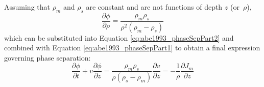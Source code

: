 Assuming that $\rho_m$ and $\rho_s$ are constant and are not functions of depth $z$ (or~$\rho$),
\begin{equation}
\frac{\partial \phi}{\partial \rho} = \frac{\rho_m \rho_s}{\rho^2 (\rho_m-\rho_s)}
\label{eq:abe1993_dphidrho}
\end{equation}
which can be substituted into Equation \ref{eq:abe1993_phaseSepPart2} and combined with Equation \ref{eq:abe1993_phaseSepPart1} to obtain a final expression governing phase separation:
\begin{equation}
\frac{\partial \phi}{\partial t} + v \frac{\partial \phi}{\partial z} = \frac{\rho_m \rho_s}{\rho (\rho_s-\rho_m)} \frac{\partial v}{\partial z}
= - \frac{1}{\rho} \frac{\partial J_m}{\partial z}
\label{eq:abe1993_phaseSep}
\end{equation}

